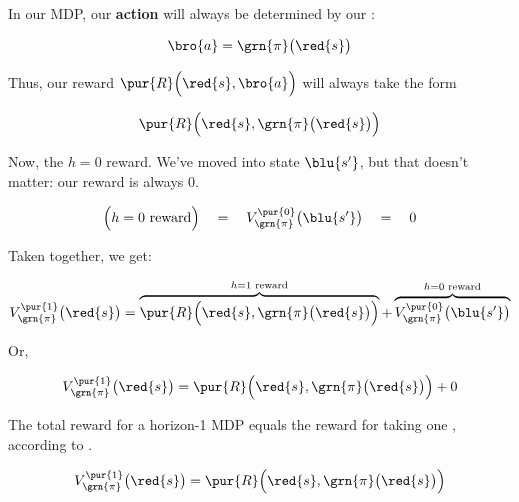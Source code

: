         \begin{concept}
            In our MDP, our \textbf{action} will always be determined by our : 
            
            \begin{equation*}
                \bro{a} = \grn{\pi} \big(\red{s} \big)
            \end{equation*}

            Thus, our reward $\pur{R} \Big( \red{s},\bro{a} \Big)$ will always take the form

            \begin{equation*}
                \pur{R} \Big( \red{s},\grn{\pi}\big(\red{s}\big) \Big)
            \end{equation*}
        \end{concept}

        Now, the $h=0$ reward. We've moved into state $\blu{s'}$, but that doesn't matter: our reward is always 0.

        \begin{equation}
            \Big(h=0 \text{ reward}\Big) \quad=\quad 
            V_{\grn{\pi}}^{\pur{0}}\big(\blu{s'} \big) 
            \quad=\quad 0
        \end{equation}
    
        Taken together, we get:

        \begin{equation}
            V_{\grn{\pi}}^{\pur{1}}\big(\red{s} \big) = 
            \overbrace{
                \pur{R} \Big( \red{s},\grn{\pi}\big(\red{s}\big) \Big)
            }^{h=1 \text{ reward}}
            + 
            \overbrace{
                V_{\grn{\pi}}^{\pur{0}}\big(\blu{s'} \big)
            }^{h=0 \text{ reward}}
        \end{equation}

        Or, 

        \begin{equation}
            V_{\grn{\pi}}^{\pur{1}}\big(\red{s} \big) = 
                \pur{R} \Big( \red{s},\grn{\pi}\big(\red{s}\big) \Big)
            + 
            0
        \end{equation}

        \begin{kequation}
            The total reward for a horizon-1 MDP equals the reward for taking one , according to .
    
            \begin{equation*}
                V_{\grn{\pi}}^{\pur{1}}\big(\red{s} \big) = 
                    \pur{R} \Big( \red{s},\grn{\pi}\big(\red{s}\big) \Big)
            \end{equation*}
        \end{kequation}

